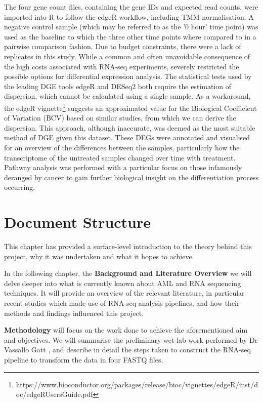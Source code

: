 The four gene count files, containing the gene IDs and expected read counts, were imported into R \citep{R} to follow the edgeR \citep{edger} workflow, including \ac{TMM} normalisation. A negative control sample (which may be referred to as the '0 hour' time point) was used as the baseline to which the three other time points where compared to in a pairwise comparison fashion. Due to budget constraints, there were a lack of replicates in this study. While a common and often unavoidable consequence of the high costs associated with RNA-seq experiments, severely restricted the possible options for differential expression analysis. The statistical tests used by the leading \ac{DGE} tools edgeR and DESeq2 \citep{love2014moderated} both require the estimation of dispersion, which cannot be calculated using a single sample. As a workaround, the edgeR vignette\footnote{https://www.bioconductor.org/packages/release/bioc/vignettes/edgeR/inst/doc/edgeRUsersGuide.pdf} suggests an approximated value for the Biological Coefficient of Variation (BCV) based on similar studies, from which we can derive the dispersion. This approach, although inaccurate, was deemed as the most suitable method of \ac{DGE} given this dataset. These \ac{DEG}s were annotated and visualised for an overview of the differences between the samples, particularly how the transcriptome of the untreated samples changed over time with treatment. Pathway analysis was performed with a particular focus on those infamously deranged by cancer to gain further biological insight on the differentiation process occurring.


\section{Document Structure}
This chapter has provided a surface-level introduction to the theory behind this project, why it was undertaken and what it hopes to achieve.

In the following chapter, the \textbf{Background and Literature Overview} we will delve deeper into what is currently known about \ac{AML} and RNA sequencing techniques. It will provide an overview of the relevant literature, in particular recent studies which made use of RNA-seq analysis pipelines, and how their methods and findings influenced this project.

\textbf{Methodology} will focus on the work done to achieve the aforementioned aim and objectives. We will summarise the preliminary wet-lab work performed by Dr Vassallo Gatt  \citep{Gatt2016}, and describe in detail the steps taken to construct the RNA-seq pipeline to transform the data in four FASTQ files.

